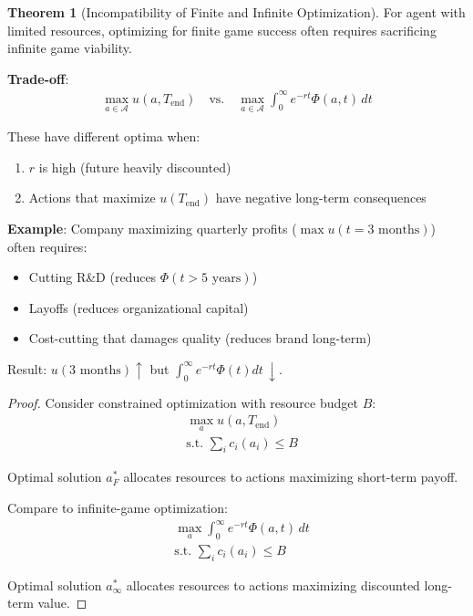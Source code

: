 \documentclass[11pt,a4paper]{article}
\theoremstyle{definition}
\newtheorem{theorem}{Theorem}[section]
\theoremstyle{remark}
\begin{document}
\begin{small}
\begin{enumerate}
\begin{theorem}[Incompatibility of Finite and Infinite Optimization]
For agent with limited resources, optimizing for finite game success often requires sacrificing infinite game viability.

\textbf{Trade-off}:
\begin{align}
\max_{a \in \mathcal{A}} u(a, T_{\text{end}}) \quad \text{vs.} \quad \max_{a \in \mathcal{A}} \int_0^\infty e^{-rt} \Phi(a, t) \, dt
\end{align}

These have different optima when:
\begin{enumerate}
    \item \(r\) is high (future heavily discounted)
    \item Actions that maximize \(u(T_{\text{end}})\) have negative long-term consequences
\end{enumerate}

\textbf{Example}: Company maximizing quarterly profits (\(\max u(t=3 \text{ months})\)) often requires:
\begin{itemize}
    \item Cutting R\&D (reduces \(\Phi(t > 5 \text{ years})\))
    \item Layoffs (reduces organizational capital)
    \item Cost-cutting that damages quality (reduces brand long-term)
\end{itemize}

Result: \(u(3 \text{ months}) \uparrow\) but \(\int_0^\infty e^{-rt} \Phi(t) dt \, \downarrow\).
\end{theorem}

\begin{proof}
Consider constrained optimization with resource budget \(B\):
\begin{align}
&\max_{a} u(a, T_{\text{end}}) \\
&\text{s.t. } \sum_i c_i(a_i) \leq B
\end{align}

Optimal solution \(a^*_F\) allocates resources to actions maximizing short-term payoff.

Compare to infinite-game optimization:
\begin{align}
&\max_{a} \int_0^\infty e^{-rt} \Phi(a, t) \, dt \\
&\text{s.t. } \sum_i c_i(a_i) \leq B
\end{align}

Optimal solution \(a^*_\infty\) allocates resources to actions maximizing discounted long-term value.


\end{proof}
\end{enumerate}
\end{small}
\end{document}
